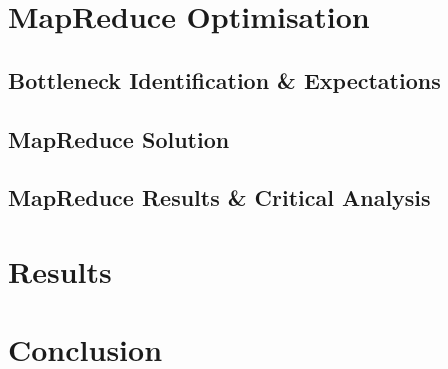 \documentclass[11pt]{article}
\begin{document}
\section{MapReduce Optimisation}

\subsection{Bottleneck Identification \& Expectations}

\subsection{MapReduce Solution}

\subsection{MapReduce Results \& Critical Analysis}

\section{Results}

\section{Conclusion}
\end{document}
